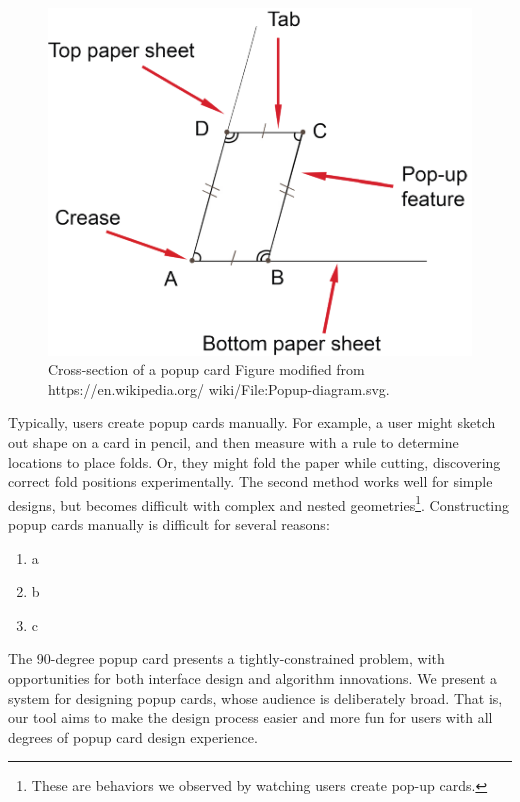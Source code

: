 \begin{figure}[htbp]
\centering
\includegraphics{figures/shared/01_Background/popup-diagram.pdf}
\caption{Cross-section of a popup card Figure modified from
https://en.wikipedia.org/ wiki/File:Popup-diagram.svg.}
\end{figure}

Typically, users create popup cards manually. For example, a user might
sketch out shape on a card in pencil, and then measure with a rule to
determine locations to place folds. Or, they might fold the paper while
cutting, discovering correct fold positions experimentally. The second
method works well for simple designs, but becomes difficult with complex
and nested geometries\footnote{These are behaviors we observed by
  watching users create pop-up cards.}. Constructing popup cards
manually is difficult for several reasons:

\begin{enumerate}
\def\labelenumi{\arabic{enumi}.}
\itemsep1pt\parskip0pt
\item
  a
\item
  b
\item
  c
\end{enumerate}

The 90-degree popup card presents a tightly-constrained problem, with
opportunities for both interface design and algorithm innovations. We
present a system for designing popup cards, whose audience is
deliberately broad. That is, our tool aims to make the design process
easier and more fun for users with all degrees of popup card design
experience.
